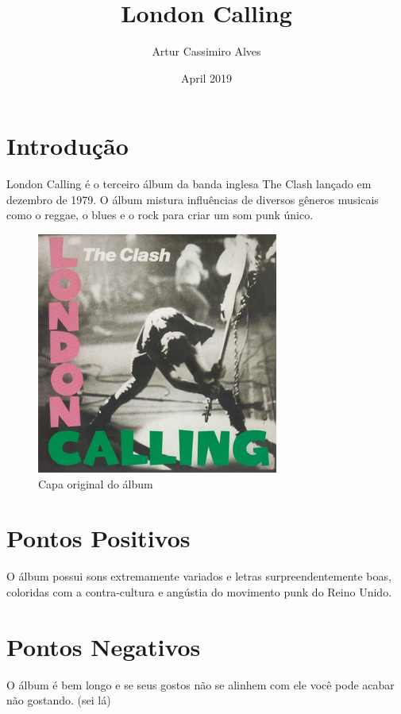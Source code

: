 \documentclass{article}
\title{London Calling}
\author{Artur Cassimiro Alves}
\date{April 2019}
\begin{document}
\maketitle

\section{Introdução}
London Calling é o terceiro álbum da banda inglesa The Clash lançado em dezembro de 1979. O álbum mistura influências de diversos gêneros musicais como o reggae, o blues e o rock para criar um som punk único.
\cite{wikipediaLondonCalling}

\begin{figure}[h!]
\centering
\includegraphics[scale=1.0]{LondonCalling}
\caption{Capa original do álbum}
\label{fig:London Calling}
\end{figure}

\section{Pontos Positivos}
O álbum possui sons extremamente variados e letras surpreendentemente boas, coloridas com a contra-cultura e angústia do movimento punk do Reino Unido.

\section{Pontos Negativos}
O álbum é bem longo e se seus gostos não se alinhem com ele você pode acabar não gostando. (sei lá)



\end{document}
